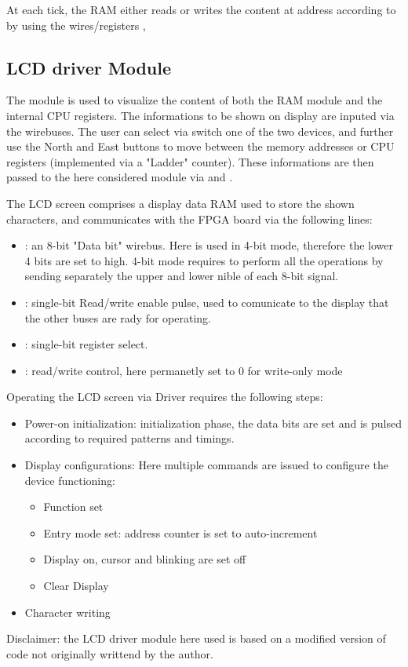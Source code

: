 At each  tick, the RAM either reads or writes the content at address  according to 
by using the wires/registers , 


\subsection{LCD driver Module}  \label{ssec:lcd}
The  module is used to visualize the content of both the RAM module and the internal CPU registers.
The informations to be shown on display are inputed via the  wirebuses.
The user can select via switch one of the two devices, and further use the North and East buttons to move between the memory addresses
or CPU registers (implemented via a "Ladder" counter).
These informations are then passed to the here considered module via  and .

The LCD screen comprises a display data RAM used to store the shown characters,
and communicates with the FPGA board via the following lines:
\begin{itemize}
    \item {}: an 8-bit "Data bit" wirebus. Here is used in 4-bit mode, therefore the lower 4 bits are set to high. 
    4-bit mode requires to perform all the operations by sending separately the upper and lower nible of each 8-bit signal.
    \item {}: single-bit Read/write enable pulse, used to comunicate to the display that the other buses are rady for operating.
    \item {}: single-bit register select.
    \item {}: read/write control, here permanetly set to 0 for write-only mode
\end{itemize}
Operating the LCD screen via Driver requires the following steps:
\begin{itemize}
    \item Power-on initialization: initialization phase, the data bits are set and  is pulsed according to required patterns and timings.
    \item Display configurations: Here multiple commands are issued to configure the device functioning:
    \begin{itemize}
        \item Function set
        \item Entry mode set: address counter is set to auto-increment
        \item Display on, cursor and blinking are set off
        \item Clear Display
    \end{itemize}
    \item Character writing
\end{itemize}

Disclaimer: the LCD driver module here used is based on a modified version of code not originally writtend by the author.